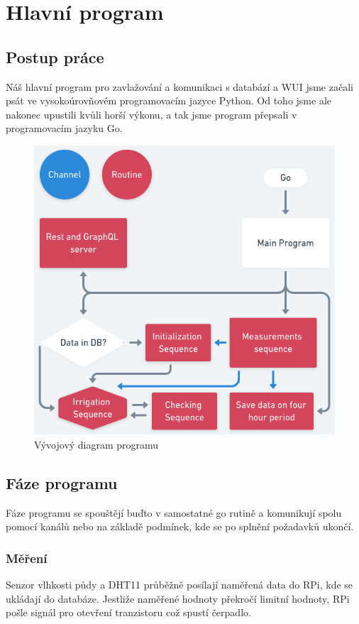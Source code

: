 \documentclass[12pt,a4paper]{article}
\begin{document}
\clearpage

\section{Hlavní program}

\subsection{Postup práce}

Náš hlavní program pro zavlažování a komunikaci s databází a \ac{WUI} jsme začali psát ve vysokoúrovňovém programovacím jazyce Python. Od toho jsme ale nakonec upustili kvůli horší výkonu, a tak jsme program přepsali v programovacím jazyku Go.

\begin{figure}[h]
	\centering
	\includegraphics[width=0.72\linewidth]{go.png}
	\caption{Vývojový diagram programu}
\end{figure}

\subsection{Fáze programu}

Fáze programu se spouštějí buďto v samostatné go rutině a komunikují spolu pomocí kanálů nebo na základě podmínek, kde se po splnění požadavků ukončí.

\subsubsection{Měření}

Senzor vlhkosti půdy a \ac{DHT11} průběžně posílají naměřená data do \ac{RPi}, kde se ukládají do databáze. Jestliže naměřené hodnoty překročí limitní hodnoty, \ac{RPi} pošle signál pro otevření tranzistoru což spustí čerpadlo.
\end{document}
